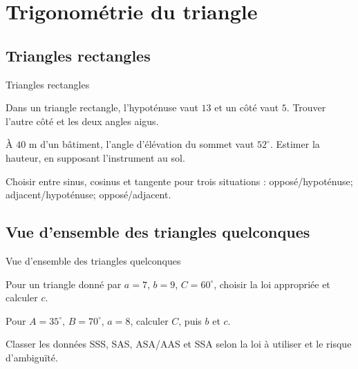 \chapter{Trigonométrie du triangle}
\label{workbook:chapter:15}
\section{Triangles rectangles}
\label{workbook:section:15.01}
\begin{exerciseblock}{Triangles rectangles}
\item Dans un triangle rectangle, l'hypoténuse vaut $13$ et un côté vaut $5$. Trouver l'autre côté et les deux angles aigus.
\item À $40$ m d'un bâtiment, l'angle d'élévation du sommet vaut $52^\circ$. Estimer la hauteur, en supposant l'instrument au sol.
\item Choisir entre sinus, cosinus et tangente pour trois situations : opposé/hypoténuse; adjacent/hypoténuse; opposé/adjacent.
\end{exerciseblock}
\section{Vue d'ensemble des triangles quelconques}
\label{workbook:section:15.02}
\begin{exerciseblock}{Vue d'ensemble des triangles quelconques}
\item Pour un triangle donné par $a=7$, $b=9$, $C=60^\circ$, choisir la loi appropriée et calculer $c$.
\item Pour $A=35^\circ$, $B=70^\circ$, $a=8$, calculer $C$, puis $b$ et $c$.
\item Classer les données SSS, SAS, ASA/AAS et SSA selon la loi à utiliser et le risque d'ambiguïté.
\end{exerciseblock}
